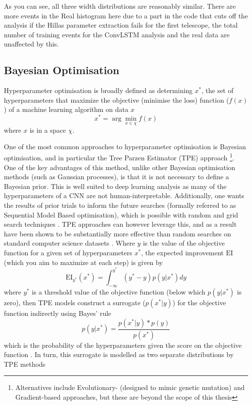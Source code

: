 As you can see, all three width distributions are reasonably similar. There are more events in the Real histogram here due to a part in the code that cuts off the analysis if the Hillas parameter extraction fails for the first telescope, the total number of training events for the ConvLSTM analysis and the real data are unaffected by this.

\subsection{Bayesian Optimisation}

Hyperparameter optimisation is broadly defined as determining $x^*$, the set of hyperparameters that maximize the objective (minimise the loss) function ($f(x)$) of a machine learning algorithm on  data $x$ \begin{equation}
    x^*=\arg \min_{x \in \chi} f(x)
\end{equation}
where $x$ is in a space $\chi$.

One of the most common approaches to hyperparameter optimisation is Bayesian optimisation, and in particular the Tree Parzen Estimator (TPE) approach \cite{bergestra}\cite{tdshyper} \footnote{Alternatives include Evolutionary- (designed to mimic genetic mutation) and Gradient-based approaches, but these are beyond the scope of this thesis}. One of the key advantages of this method, unlike other Bayesian optimisation methods (such as Gaussian processes), is that it is not necessary to define a Bayesian prior. This is well suited to deep learning analysis as many of the hyperparameters of a CNN are not human-interpretable. Additionally, one wants the results of prior trials to inform the future searches (formally referred to as Sequential Model Based optimisation), which is possible with random and grid search techniques \cite{tdshyper}. TPE approaches can however leverage this, and as a result have been shown to be substantially more effective than random searches on standard computer science datasets \cite{bergestra}. Where $y$ is the value of the objective function for a given set of hyperparameters $x^*$, the expected improvement $\textrm{EI}$ (which you aim to maximize at each step) is given by
\begin{equation}
    \textrm{EI}_{y^*}(x^*)=\int_{-\infty}^{y^*}(y^*-y)p(y|x^*)dy
\end{equation}
where $y^*$ is a threshold value of the objective function (below which $p(y|x^*)$ is zero), then TPE models construct a surrogate ($p(x^*|y)$) for the objective function indirectly using Bayes' rule
\begin{equation}
    p(y|x^*)=\frac{p(x^*|y)*p(y)}{p(x^*)}
\end{equation}
which is the probability of the hyperparameters given the score on the objective function \cite{tdshyper}. In turn, this surrogate is modelled as two separate distributions by TPE methods

